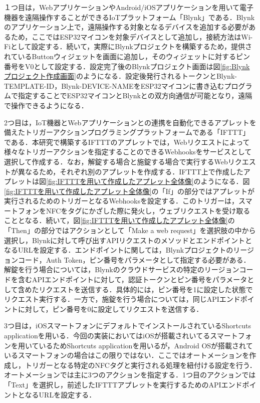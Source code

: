       \par １つ目は，WebアプリケーションやAndroid/iOSアプリケーションを用いて電子機器を遠隔操作することができるIoTプラットフォーム「Blynk」である．Blynkのアプリケーション上で，遠隔操作する対象となるデバイスを追加する必要があるため，ここではESP32マイコンを対象デバイスとして追加し，接続方法はWi-Fiとして設定する．続いて，実際にBlynkプロジェクトを構築するため，提供されているButtonウィジェットを画面に追加し，そのウィジェットに対するピン番号をV0として設定する．設定完了後のBlynkプロジェクト画面は図\ref{fig:Blynkプロジェクト作成画面}のようになる．設定後発行されるトークンとBlynk-TEMPLATE-ID，Blynk-DEVICE-NAMEをESP32マイコンに書き込むプログラムで指定することでESP32マイコンとBlynkとの双方向通信が可能となり，遠隔で操作できるようになる．
      \par 2つ目は，IoT機器とWebアプリケーションとの連携を自動化できるアプレットを備えたトリガーアクションプログラミングプラットフォームである「IFTTT」である．本研究で構築するIFTTTのアプレットでは，Webリクエストによって様々なトリガーアクションを指定することのできるWebhooksをサービスとして選択して作成する．なお，解錠する場合と施錠する場合で実行するWebリクエストが異なるため，それぞれ別のアプレットを作成する．IFTTT上で作成したアプレットは図\ref{fig:IFTTTを用いて作成したアプレット全体像}のようになる．図\ref{fig:IFTTTを用いて作成したアプレット全体像}の「If」の部分ではアプレットが実行されるためのトリガーとなるWebhooksを設定する．このトリガーは，スマートフォンをNFCをタグにかざした際に発火し，ウェブリクエストを受け取ることとなる．続いて，図\ref{fig:IFTTTを用いて作成したアプレット全体像}の「Then」の部分ではアクションとして「Make a web request」を選択肢の中から選択し，Blynkに対して呼び出すAPIリクエストのメソッドとエンドポイントとなるURLを設定する．エンドポイントに関しては，Blynkプロジェクトのリージョンコード，Auth Token，ピン番号をパラメータとして指定する必要がある．解錠を行う場合については，Blynkのクラウドサービスの特定のリージョンコードを含むAPIエンドポイントに対して，認証トークンとピン番号をパラメータとして含めたリクエストを送信する．具体的には，ピン番号を1に設定した状態でリクエスト実行する．一方で，施錠を行う場合については，同じAPIエンドポイントに対して，ピン番号を0に設定してリクエストを送信する．
      \par 3つ目は，iOSスマートフォンにデフォルトでインストールされているShortcuts applicationを用いる．今回の実装においてはiOSが搭載されいてるスマートフォンを用いているためShortcuts applicationを用いるが，Android OSが搭載されているスマートフォンの場合はこの限りではない．ここではオートメーションを作成し，トリガーとなる特定のNFCタグと実行される処理を紐付ける設定を行う．オートメーションでは主に3つのアクションを指定する．1つ目のアクションでは「Text」を選択し，前述したIFTTTアプレットを実行するためのAPIエンドポイントとなるURLを設定する．
